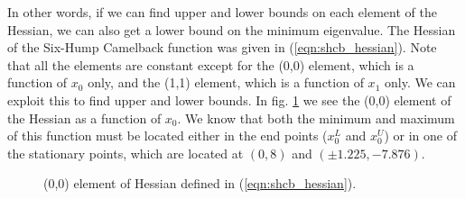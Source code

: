 In other words, if we can find upper and lower bounds on each element of the Hessian, we can also get a lower bound on the minimum eigenvalue. The Hessian of the Six-Hump Camelback function was given in (\ref{eqn:shcb_hessian}). Note that all the elements are constant except for the (0,0) element, which is a function of $x_0$ only, and the (1,1) element, which is a function of $x_1$ only. We can exploit this to find upper and lower bounds. In fig. \ref{fig:shcb_h00} we see the (0,0) element of the Hessian as a function of $x_0$. We know that both the minimum and maximum of this function must be located either in the end points ($x_0^L$ and $x_0^U$) or in one of the stationary points, which are located at $(0,8)$ and $(\pm 1.225, -7.876)$.
\begin{figure}[H]
\centering
{}
\caption{(0,0) element of Hessian defined in (\ref{eqn:shcb_hessian}).}
\label{fig:shcb_h00}
\end{figure}
